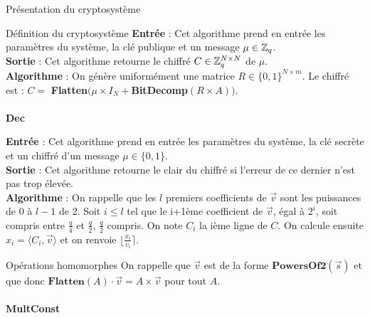 \begin{section}{Présentation du cryptosystème}
\begin{subsection}{Définition du cryptosystème}
	\textbf{Entrée} : Cet algorithme prend en entrée les paramètres du système, la clé publique et un message $\mu \in \mathbb{Z}_q$. \\
	\textbf{Sortie} : Cet algorithme retourne le chiffré $C \in \mathbb{Z}_q^{N \times N}$ de $\mu$.\\
	\textbf{Algorithme} : On génère uniformément une matrice $R \in \{ 0,1\} ^{N \times m}$. Le chiffré est : $C = $ \textbf{Flatten}$(\mu \times I_N + $\textbf{BitDecomp}$(R \times A))$.
	
	\paragraph{}
	\textbf{Dec}
	\flushleft
	
	\textbf{Entrée} : Cet algorithme prend en entrée les paramètres du système, la clé secrète et un chiffré d'un message $\mu \in \{ 0,1\} $. \\
	\textbf{Sortie} : Cet algorithme retourne le clair du chiffré si l'erreur de ce dernier n'est pas trop élevée.\\
	\textbf{Algorithme} : On rappelle que les $l$ premiers coefficients de $\vec{v}$ sont les puissances de 0 à $l-1$ de 2. Soit $i \leqslant l$ tel que le i+1ème coefficient de $\vec{v}$, égal à $2^{i}$, soit compris entre $\frac{q}{4}$ et $\frac{q}{2}$, $\frac{q}{2}$ compris. On note $C_i$ la ième ligne de $C$. On calcule ensuite $x_i = \langle C_i, \vec{v} \rangle$ et on renvoie $\lfloor \frac{x_i}{v_i} \rceil$.
	\end{subsection}
	
	\begin{subsection}{Opérations homomorphes}
	On rappelle que $\vec{v}$ est de la forme $\textbf{PowersOf2}(\vec{s})$ et que donc $\textbf{Flatten}(A) \cdot \vec{v} = A \times \vec{v}$ pour tout $A$.
	
	\paragraph{}
	\textbf{MultConst}
	\flushleft
	

\end{subsection}
\end{section}
